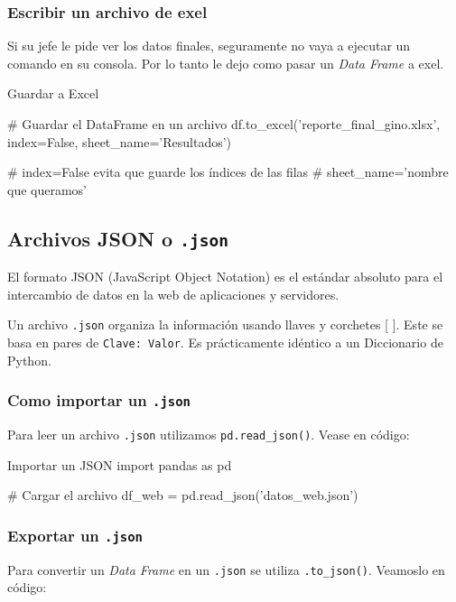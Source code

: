 \subsubsection{Escribir un archivo de exel}

Si su jefe le pide ver los datos finales, seguramente no vaya a ejecutar un comando en su consola. Por lo tanto le dejo como pasar un \textit{Data Frame} a exel.

\begin{pycode}{Guardar a Excel}

# Guardar el DataFrame en un archivo 
df.to_excel('reporte_final_gino.xlsx', index=False, sheet_name='Resultados')

# index=False evita que guarde los índices de las filas
# sheet_name='nombre que queramos' 

\end{pycode}




\subsection{Archivos JSON o \texttt{.json}}

El formato JSON (JavaScript Object Notation) es el estándar absoluto para el intercambio de datos en la web de aplicaciones y servidores.

Un archivo \texttt{.json} organiza la información usando llaves { } y corchetes [ ]. Este se basa en pares de \texttt{Clave: Valor}. Es prácticamente idéntico a un Diccionario de Python.

\subsubsection{Como importar un \texttt{.json}}

Para leer un archivo \texttt{.json} utilizamos \texttt{pd.read\_json()}. Vease en código:

\begin{pycode}{Importar un JSON}
import pandas as pd

# Cargar el archivo
df_web = pd.read_json('datos_web.json')
\end{pycode}

\subsubsection{Exportar un \texttt{.json}}

Para convertir un \textit{Data Frame} en un \texttt{.json} se utiliza \texttt{.to\_json()}. Veamoslo en código:

